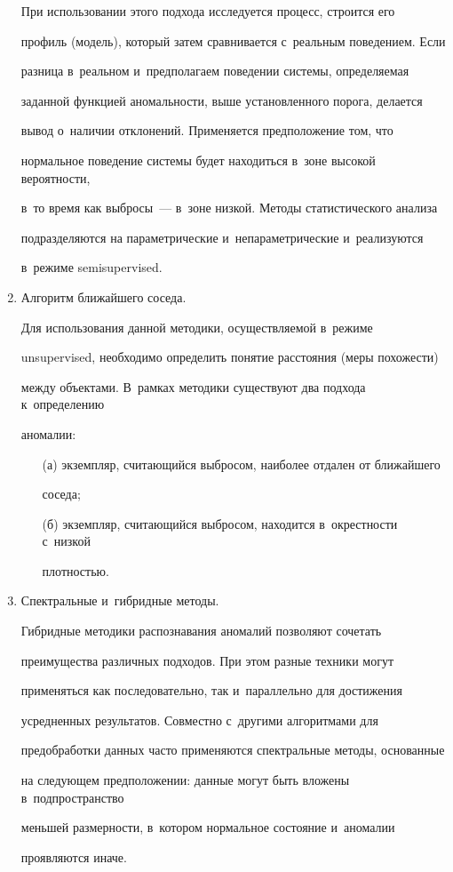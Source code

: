 \begin{enumerate}[1.]
  


  При использовании этого подхода исследуется процесс, строится его 


профиль (модель), который затем сравнивается с~реальным поведением. Если 


разница в~реальном и~предполагаем поведении системы, определяемая 


заданной функцией аномальности, выше установленного порога, делается 


вывод о~наличии отклонений. Применяется предположение том, что 


нормальное поведение системы будет находиться в~зоне высокой вероятности, 


в~то время как выбросы~--- в~зоне низкой. Методы статистического анализа 


подразделяются на параметрические и~непараметрические и~реализуются 


в~режиме semisupervised.


  \item Алгоритм ближайшего соседа.


  


  Для использования данной методики, осуществляемой в~режиме 


unsupervised, необходимо определить понятие расстояния (меры похожести) 


между объектами. В~рамках методики существуют два подхода к~определению 


аномалии:


  \begin{itemize}


  \item[(а)] экземпляр, считающийся выбросом, наиболее отдален от ближайшего 


соседа;


  \item[(б)] экземпляр, считающийся выбросом, находится в~окрестности с~низкой 


плотностью.


  \end{itemize}


  \item Спектральные и~гибридные методы.


  


  Гибридные методики распознавания аномалий позволяют сочетать 


преимущества различных подходов. При этом разные техники могут 


применяться как последовательно, так и~параллельно для достижения 


усредненных результатов. Совместно с~другими алгоритмами для 


предобработки данных часто применяются спектральные методы, основанные 


на следующем предположении: данные могут быть вложены в~подпространство 


меньшей размерности, в~котором нормальное состояние и~аномалии 


проявляются иначе.


  \end{enumerate}
